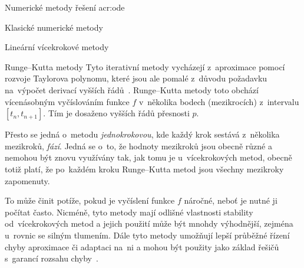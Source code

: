 \documentclass[thesis=M,czech]{FITthesis}[2012/06/26]
\newcommand{\acrlabel}[1]{acr:#1}
\newcommand{\acr}[1]{\acrshort{\acrlabel{#1}}}
\newcommand{\hl}[1]{\textit{#1}}
\newcommand{\name}[1]{\hl{#1}}
\newcommand{\cit}[1]{\cite{#1}}
\begin{document}
\begin{section}{Numerické metody řešení \acr{ode}}
\begin{subsection}{Klasické numerické metody}
\begin{subsubsection}{Lineární vícekrokové metody}

\end{subsubsection} %


\begin{subsubsection}{Runge--Kutta metody}\label{sss:search:ode:classic:rk}
Tyto iterativní metody vycházejí z~aproximace
pomocí rozvoje Taylorova polynomu,
které jsou ale pomalé z~důvodu požadavku
na~výpočet derivací vyšších řádů~\cit{ode-nsolve-book}.
Runge--Kutta metody toto obchází
vícenásobným vyčíslováním funkce $f$
v~několika bodech (mezikrocích)
z~intervalu $[t_{n}, t_{n+1}]$.
Tím je dosaženo vyšších řádů přesnosti $p$.

Přesto se jedná o~metodu \hl{jednokrokovou},
kde každý krok sestává z~několika mezikroků, \name{fází}.
Jedná se o~to,
že hodnoty mezikroků jsou obecně různé
a nemohou být znovu využívány tak,
jak tomu je u~vícekrokových metod,
obecně totiž platí,
že po~každém kroku Runge--Kutta metod
jsou všechny mezikroky zapomenuty.

To může činit potíže,
pokud je vyčíslení funkce $f$ náročné,
neboť je nutné ji počítat často.
Nicméně, tyto metody
mají odlišné vlastnosti stability
od~vícekrokových metod
a jejich použití může být mnohdy výhodnější,
zejména u~rovnic se silným tlumením.
Dále tyto metody umožňují lepší průběžné řízení chyby aproximace
či adaptaci na~ni
a mohou být použity jako základ
řešičů s~garancí rozsahu chyby~\cit{ode-valid-runge_kutta-art}.


\end{subsubsection}
\end{subsection}
\end{section}
\end{document}
